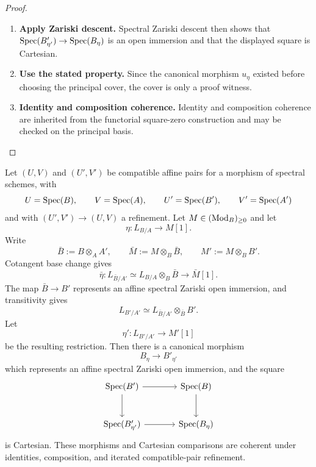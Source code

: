 \begin{proof}
\begin{enumerate}[label=\textup{(\arabic*)}]
    \item \textbf{Apply Zariski descent.}
    Spectral Zariski descent then shows that \(\operatorname{Spec}(B'_{\eta'})\to\operatorname{Spec}(B_\eta)\) is an open immersion and that the
    displayed square is Cartesian.

    \item \textbf{Use the stated property.}
    Since the canonical morphism \(u_\eta\) existed before choosing the principal cover, the
    cover is only a proof witness.

    \item \textbf{Identity and composition coherence.}
    Identity and composition coherence are inherited from the functorial square-zero
    construction and may be checked on the principal basis.
\end{enumerate}
\end{proof}

\begin{lemma}
\label{lem:square-zero-compatible-pair-restriction}
Let \((U,V)\) and \((U',V')\) be compatible affine pairs for a morphism of
spectral schemes, with
\[
    U=\operatorname{Spec}(B),\qquad V=\operatorname{Spec}(A),\qquad
    U'=\operatorname{Spec}(B'),\qquad V'=\operatorname{Spec}(A')
\]
and with \((U',V')\to(U,V)\) a refinement. Let
\(M\in(\operatorname{Mod}_B)_{\geq0}\) and let
\[
    \eta:L_{B/A}\longrightarrow M[1].
\]
Write
\[
    \bar B:=B\otimes_AA',
    \qquad
    \bar M:=M\otimes_B\bar B,
    \qquad
    M':=M\otimes_BB'.
\]
Cotangent base change gives
\[
    \bar\eta:
    L_{\bar B/A'}
    \simeq
    L_{B/A}\otimes_B\bar B
    \longrightarrow
    \bar M[1].
\]
The map \(\bar B\to B'\) represents an affine spectral Zariski open
immersion, and transitivity gives
\[
    L_{B'/A'}
    \simeq
    L_{\bar B/A'}\otimes_{\bar B}B'.
\]
Let
\[
    \eta':L_{B'/A'}\longrightarrow M'[1]
\]
be the resulting restriction. Then there is a canonical morphism
\[
    B_\eta\longrightarrow B'_{\eta'}
\]
which represents an affine spectral Zariski open immersion, and the square
\[
\begin{tikzcd}[column sep=large,row sep=large]
    \Spec(B') \arrow[r] \arrow[d]
        & \Spec(B) \arrow[d]
    \\
    \Spec(B'_{\eta'}) \arrow[r]
        & \Spec(B_\eta)
\end{tikzcd}
\]
is Cartesian. These morphisms and Cartesian comparisons are coherent under
identities, composition, and iterated compatible-pair refinement.
\end{lemma}


